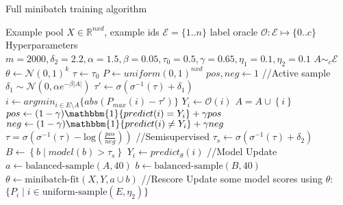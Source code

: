 \documentclass{article}
\begin{document}
\begin{algorithm}
\caption{Full minibatch training algorithm}
\label{alg:the_alg}
\begin{algorithmic}[1]
\Require Example pool $X\in\mathbb{R}^{nxd}$, example ids $\mathcal{E}=\{1..n\}$
\Require label oracle $\mathcal{O}:\mathcal{E}\mapsto\{0..c\}$ 
\State Hyperparameters $m=2000, \delta_2=2.2, \alpha=1.5, \beta=0.05, \tau_0=0.5, \gamma=0.65, \eta_1=0.1,\eta_2=0.1$ 
\State $A \sim_{c} \mathcal{E} $ 
\State $\theta \leftarrow \mathcal{N}(0,1)^{k}$ 
\State $\tau \leftarrow \tau_0 $ 
\State $P \leftarrow uniform(0,1)^{nxd}$ 
\State $pos,neg \leftarrow 1$ 
\State 
\State //Active
 
\State sample $\delta_1 \sim  \mathcal{N}(0,\alpha e^{-\beta | A | })$ 
\State $\tau' \leftarrow \sigma(\sigma^{-1}(\tau)+\delta_1)$ 
\State $i \leftarrow argmin_{i \in E \setminus A} \{ abs(P_{max}(i) - \tau')\}$ 
\State $Y_i \leftarrow \mathcal{O}(i)$ 
\State $A = A \cup \left\{ i \right\}$ 
\State $pos \leftarrow (1-\gamma)\mathbbm{1}\{predict(i)=Y_i\} + \gamma pos$ 
\State $neg \leftarrow (1-\gamma)\mathbbm{1}\{predict(i) \neq Y_i\} + \gamma neg$
\State $\tau = \sigma(\sigma^{-1}(\tau) - \mathrm{ log}(\frac{pos}{neg}))$ 
\EndIf
\State 
\State //Semisupervised
\State $\tau_s \leftarrow \sigma(\sigma^{-1}(\tau)+\delta_2)$ 
\State $B \leftarrow \left\{b \mid model(b)> \tau_s \right\}$ 
\State $Y_i \leftarrow predict_{\theta} (i)$  
\EndFor
\State
\State //Model Update
\State $a \leftarrow \textrm{balanced-sample}(A,40)$
\State $b \leftarrow \textrm{balanced-sample}(B,40)$
\State $\theta \leftarrow \textrm{minibatch-fit}(X,Y,a \cup b)$ 
\State
\State //Rescore
\State Update some model scores using $\theta$: $\{ P_i \mid i \in \textrm{uniform-sample}(E,\eta_2) \}$
\EndFor
\end{algorithmic}
\end{algorithm}
\end{document}
